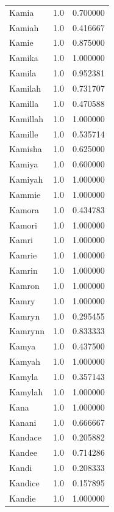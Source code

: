 \documentclass[
  letterpaper,
  DIV=11,
  numbers=noendperiod]{scrreprt}
\begin{document}
\begin{tabular}{lrr}
Kamia           &   1.0 &   0.700000 \\
Kamiah          &   1.0 &   0.416667 \\
Kamie           &   1.0 &   0.875000 \\
Kamika          &   1.0 &   1.000000 \\
Kamila          &   1.0 &   0.952381 \\
Kamilah         &   1.0 &   0.731707 \\
Kamilla         &   1.0 &   0.470588 \\
Kamillah        &   1.0 &   1.000000 \\
Kamille         &   1.0 &   0.535714 \\
Kamisha         &   1.0 &   0.625000 \\
Kamiya          &   1.0 &   0.600000 \\
Kamiyah         &   1.0 &   1.000000 \\
Kammie          &   1.0 &   1.000000 \\
Kamora          &   1.0 &   0.434783 \\
Kamori          &   1.0 &   1.000000 \\
Kamri           &   1.0 &   1.000000 \\
Kamrie          &   1.0 &   1.000000 \\
Kamrin          &   1.0 &   1.000000 \\
Kamron          &   1.0 &   1.000000 \\
Kamry           &   1.0 &   1.000000 \\
Kamryn          &   1.0 &   0.295455 \\
Kamrynn         &   1.0 &   0.833333 \\
Kamya           &   1.0 &   0.437500 \\
Kamyah          &   1.0 &   1.000000 \\
Kamyla          &   1.0 &   0.357143 \\
Kamylah         &   1.0 &   1.000000 \\
Kana            &   1.0 &   1.000000 \\
Kanani          &   1.0 &   0.666667 \\
Kandace         &   1.0 &   0.205882 \\
Kandee          &   1.0 &   0.714286 \\
Kandi           &   1.0 &   0.208333 \\
Kandice         &   1.0 &   0.157895 \\
Kandie          &   1.0 &   1.000000 \\

\end{tabular}
\end{document}
